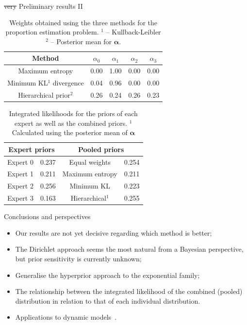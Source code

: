 \begin{frame}{\sout{very} Preliminary results II}
\begin{table}[ht]
\caption{Weights obtained using the three methods for the proportion estimation problem. $^1$ -- Kullback-Leibler $^2$ -- Posterior mean for $\boldsymbol\alpha$.}
\centering
\begin{tabular}{ccccc}
  \hline
Method  & $\alpha_0$ & $\alpha_1$ & $\alpha_2$ & $\alpha_3$ \\ 
  \hline
Maximum entropy & 0.00 & 1.00 & 0.00 & 0.00 \\ 
Minimum KL$^1$ divergence& 0.04 & 0.96 & 0.00 & 0.00 \\ 
Hierarchical prior$^2$ & 0.26 & 0.24 & 0.26 & 0.23 \\ 
   \hline
\end{tabular}
\end{table}
\begin{table}[ht]
\caption{Integrated likelihoods for the priors of each expert as well as the combined priors.
$^1$ Calculated using the posterior mean of $\boldsymbol\alpha$}
\centering
\begin{tabular}{cccc}
   \hline
   \multicolumn{2}{c}{Expert priors} &  \multicolumn{2}{c}{Pooled priors} \\
   \hline
   Expert 0 & 0.237 & Equal weights & 0.254\\
   Expert 1 & 0.211 & Maximum entropy & 0.211 \\
   Expert 2 & 0.256 & Minimum KL & 0.223\\ 
   Expert 3 & 0.163 & Hierarchical$^1$ & 0.255 \\
   \hline
\end{tabular}
\end{table}
\end{frame}
\begin{frame}{Conclusions and perspectives}
\begin{itemize}
 \item Our results are not yet decisive regarding which method is better;
 \item The Dirichlet approach seems the most natural from a Bayesian perspective, but prior sensitivity is currently unknown;
 \item Generalise the hyperprior approach to the exponential family;
 \item The relationship between the integrated likelihood of the combined (pooled) distribution in relation to that of each individual distribution.
 \item Applications to dynamic models~\citep{poole2000}.
\end{itemize}
\end{frame}
